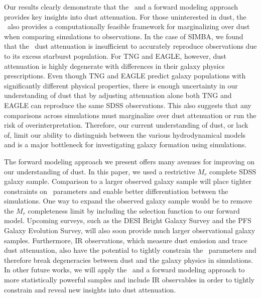 Our results clearly demonstrate that the \eda~and a forward modeling approach
provides key insights into dust attenuation. For those uninterested in dust,
the \eda~also provides a computationally feasible framework for marginalizing
over dust when comparing simulations to observations. In the case of SIMBA, we
found that the \eda~dust
attenuation is insufficient to accurately reproduce observations due to its 
excess starburst population. For TNG and EAGLE, however, dust attenuation is highly
degenerate with differences in their galaxy physics
prescriptions. Even though TNG and EAGLE predict galaxy populations with
significantly different physical properties, there is enough uncertainty in our
understanding of dust that by adjusting attenuation alone both TNG and EAGLE
can reproduce the same SDSS observations. This also suggests that any
comparisons across simulations must marginalize over dust attenuation or run 
the risk of overinterpretation. Therefore, our current understanding of dust,
or lack of, limit
our ability to distinguish between the various hydrodynamical models and is a
major bottleneck for investigating galaxy formation using simulations.

The forward modeling approach we present offers many avenues for improving on
our understanding of dust. In this paper, we used a restrictive 
$M_r$ complete SDSS galaxy sample. Comparison to a larger observed galaxy
sample will place tighter constraints on \eda~parameters and enable better
differentiation between the simulations. One way to expand the observed galaxy
sample would be to remove the $M_r$ completeness limit by including the
selection function to our forward model. Upcoming surveys, such as the DESI
Bright Galaxy Survey and the PFS Galaxy Evolution Survey, will also soon
provide much larger observational galaxy samples. Furthermore, IR observations, which measure
dust emission and trace dust attenuation, also have the potential to tightly 
constrain the \eda~parameters and therefore break degeneracies between dust
and the galaxy physics in simulations. 
In other future works, we will apply the
\eda~and a forward modeling approach to more statistically powerful samples and
include IR observables in order to tightly constrain and reveal new insights 
into dust attenuation. 
